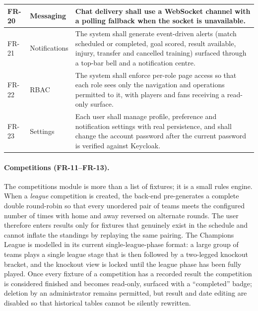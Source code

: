 \begin{table}[htbp]
\begin{tabular}{|p{}|p{}|p{}|}
\hline
FR-20 & Messaging & Chat delivery shall use a WebSocket channel with a polling fallback when the socket is unavailable. \\
\hline
FR-21 & Notifications & The system shall generate event-driven alerts (match scheduled or completed, goal scored, result available, injury, transfer and cancelled training) surfaced through a top-bar bell and a notification centre. \\
\hline
FR-22 & RBAC & The system shall enforce per-role page access so that each role sees only the navigation and operations permitted to it, with players and fans receiving a read-only surface. \\
\hline
FR-23 & Settings & Each user shall manage profile, preference and notification settings with real persistence, and shall change the account password after the current password is verified against Keycloak. \\
\hline
\end{tabular}
\end{table}

\paragraph{Competitions (FR-11--FR-13).} The competitions module is more than a list
of fixtures; it is a small rules engine. When a \emph{league} competition is created,
the back-end pre-generates a complete double round-robin so that every unordered pair
of teams meets the configured number of times with home and away reversed on
alternate rounds. The user therefore enters results only for fixtures that genuinely
exist in the schedule and cannot inflate the standings by replaying the same pairing.
The Champions League is modelled in its current single-league-phase format: a large
group of teams plays a single league stage that is then followed by a two-legged
knockout bracket, and the knockout view is locked until the league phase has been
fully played. Once every fixture of a competition has a recorded result the
competition is considered finished and becomes read-only, surfaced with a
``completed'' badge; deletion by an administrator remains permitted, but result and
date editing are disabled so that historical tables cannot be silently rewritten.

